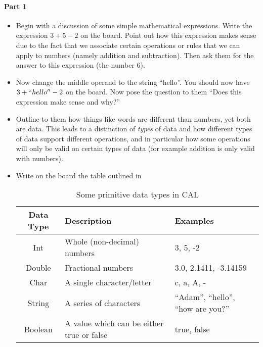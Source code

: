 	{
		\paragraph{Part 1}
		
		\begin{itemize}
			\item Begin with a discussion of some simple mathematical expressions.  Write the expression \(3 + 5 - 2\) on the board.  Point out how this expression makes sense due to the fact that we associate certain operations or rules that we can apply to numbers (namely addition and subtraction).  Then ask them for the answer to this expression (the number 6).
			\item Now change the middle operand to the string ``hello''.  You should now have \(3 + ``hello'' - 2\) on the board.  Now pose the question to them ``Does this expression make sense and why?''
			\item Outline to them how things like words are different than numbers, yet both are data.  This leads to a distinction of \emph{types} of data and how different types of data support different operations, and in particular how some operations will only be valid on certain types of data (for example addition is only valid with numbers).
			\item Write on the board the table outlined in 
			
\begin{table}
  \centering
  \begin{tabular}{c|p{6cm}|p{5cm}}
    \hline
    Data Type & Description & Examples\\ \hline
    Int & Whole (non-decimal) numbers & 3, 5, -2\\
    Double & Fractional numbers & 3.0, 2.1411, -3.14159\\
    Char & A single character/letter & c, a, A, -\\
    String & A series of characters & ``Adam'', ``hello'', ``how are you?''\\
    Boolean & A value which can be either true or false & true, false\\ 
    \hline
  \end{tabular}
  \caption{Some primitive data types in CAL}
  \label{calPrimitiveTypes}
\end{table}
			

\end{itemize}}
